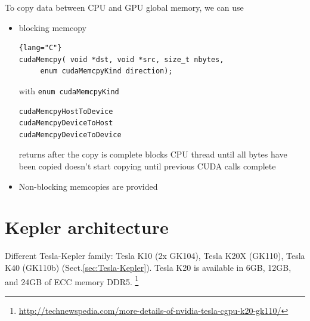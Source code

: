To copy data between CPU and GPU global memory, we can use
\begin{itemize}
\item blocking memcopy
\begin{lstlisting}{lang="C"}
cudaMemcpy( void *dst, void *src, size_t nbytes,
     enum cudaMemcpyKind direction);
\end{lstlisting}
with \verb!enum cudaMemcpyKind!
\begin{verbatim}
cudaMemcpyHostToDevice
cudaMemcpyDeviceToHost
cudaMemcpyDeviceToDevice
\end{verbatim}
returns after the copy is complete
blocks CPU thread until all bytes have been copied
doesn't start copying until previous CUDA calls complete

\item Non-blocking memcopies are provided

\end{itemize}



\chapter{Kepler architecture}
\label{chap:Kepler}


Different Tesla-Kepler family: Tesla K10 (2x GK104), Tesla K20X (GK110), Tesla
K40 (GK110b) (Sect.\ref{sec:Tesla-Kepler}). 
Tesla K20 is available in 6GB, 12GB, and 24GB of ECC memory DDR5. 
\footnote{\url{http://technewspedia.com/more-details-of-nvidia-tesla-cgpu-k20-gk110/}}

